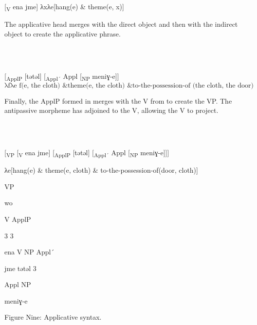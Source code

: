 \documentclass[output=paper,modfonts,nonflat]{langsci/langscibook}
\begin{document}
          [\textsubscript{V} ena jme]    λxλe[hang(e) \& theme(e, x)]    

The applicative head merges with the direct object and then with the indirect object to create the applicative phrase.

\ea%
    \label{ex:key:8}
    \gll\\
        \\
    \glt
    \z

          [\textsubscript{ApplP} [tǝtǝl] [\textsubscript{Appl´} Appl [\textsubscript{NP} meniɣ-e]]   $\text{λfλe}\text{ f(e, the cloth) \&} \text{theme}\text{(e, the cloth) \& to-the-possession}\text{{}-of}\text{ (the cloth, the door)}$

Finally, the ApplP formed in  merges with the V from  to create the VP.  The antipassive morpheme has adjoined to the V, allowing the V to project.

\ea%
    \label{ex:key:9}
    \gll\\
        \\
    \glt
    \z

          [\textsubscript{VP} [\textsubscript{V} ena jme] [\textsubscript{ApplP} [tǝtǝl] [\textsubscript{Appl´} Appl [\textsubscript{NP} meniɣ-e]]]

  λe[hang(e) \& theme(e, cloth) \& to-the-possession-of(door, cloth)]

                                              VP  

                                 wo 

        V              ApplP    

3          3

             ena            V        NP         Appl´      

                     jme        tǝtǝl   3

                               Appl         NP

                      meniɣ-e

\begin{stylecaption}
Figure Nine: Applicative syntax.
\end{stylecaption}
\end{document}
